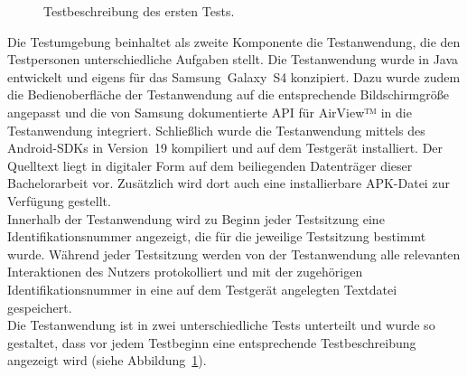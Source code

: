 \documentclass[12pt,numbers=noenddot,parskip,bibliography=totocnumbered,listof=totocnumbered]{scrreprt}
\begin{document}
\begin{figure}
\centering
\caption{Testbeschreibung des ersten Tests.}
\label{apparattestbeschreibung}
\end{figure}
Die Testumgebung beinhaltet als zweite Komponente die Testanwendung, die den Testpersonen unterschiedliche Aufgaben stellt. Die Testanwendung wurde in Java entwickelt und eigens für das \mbox{Samsung Galaxy S4} konzipiert. Dazu wurde zudem die Bedienoberfläche der Testanwendung auf die entsprechende Bildschirmgröße angepasst und die von Samsung dokumentierte API für \mbox{AirView™} in die Testanwendung integriert. Schließlich wurde die Testanwendung mittels des Android-SDKs in \mbox{Version 19} kompiliert und auf dem Testgerät installiert. Der Quelltext liegt in digitaler Form auf dem beiliegenden Datenträger dieser Bachelorarbeit vor. Zusätzlich wird dort auch eine installierbare APK-Datei zur Verfügung gestellt.\\
Innerhalb der Testanwendung wird zu Beginn jeder Testsitzung eine Identifikationsnummer angezeigt, die für die jeweilige Testsitzung bestimmt wurde. Während jeder Testsitzung werden von der Testanwendung alle relevanten Interaktionen des Nutzers protokolliert und mit der zugehörigen Identifikationsnummer in eine auf dem Testgerät angelegten Textdatei gespeichert.\\
Die Testanwendung ist in zwei unterschiedliche Tests unterteilt und wurde so gestaltet, dass vor jedem Testbeginn eine entsprechende Testbeschreibung angezeigt wird (siehe Abbildung~\ref{apparattestbeschreibung}).
\end{document}
